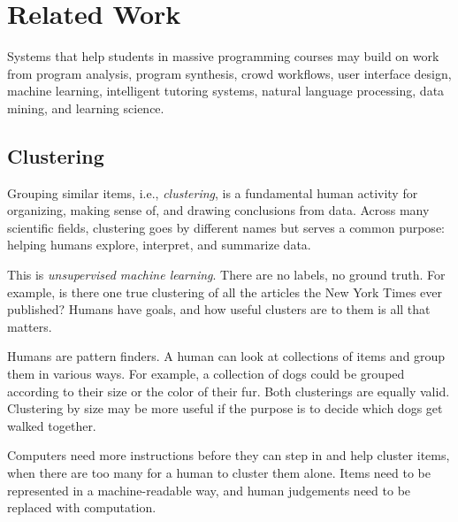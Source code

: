 \chapter{Related Work}\label{chapter:relatedwork}



Systems that help students in massive programming courses may build on work from program analysis, program synthesis, crowd workflows, user interface design, machine learning, intelligent tutoring systems, natural language processing, data mining, and learning science. %


\section{Clustering}


Grouping similar items, i.e., {\it clustering}, is a fundamental human activity for organizing, making sense of, and drawing conclusions from data. Across many scientific fields, clustering goes by different names but serves a common purpose: helping humans explore, interpret, and summarize data.

This is {\it unsupervised machine learning}. There are no labels, no ground truth. For example, is there one true clustering of all the articles the New York Times ever published? Humans have goals, and how useful clusters are to them is all that matters.

Humans are pattern finders. A human can look at collections of items and group them in various ways. For example, a collection of dogs could be grouped according to their size or the color of their fur. Both clusterings are equally valid. Clustering by size may be more useful if the purpose is to decide which dogs get walked together.

Computers need more instructions before they can step in and help cluster items, when there are too many for a human to cluster them alone. Items need to be represented in a machine-readable way, and human judgements need to be replaced with computation.

